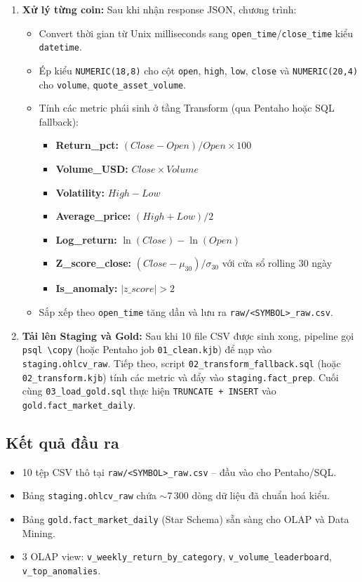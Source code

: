 \begin{enumerate}[label=\alph*)]
    \item \textbf{Xử lý từng coin:}
    Sau khi nhận response JSON, chương trình:
    \begin{itemize}
        \item Convert thời gian từ Unix milliseconds sang \texttt{open\_time}/\texttt{close\_time} kiểu \texttt{datetime}.
        \item Ép kiểu \texttt{NUMERIC(18,8)} cho cột \texttt{open}, \texttt{high}, \texttt{low}, \texttt{close} và \texttt{NUMERIC(20,4)} cho \texttt{volume}, \texttt{quote\_asset\_volume}.
        \item Tính các metric phái sinh ở tầng Transform (qua Pentaho hoặc SQL fallback):
        \begin{itemize}
            \item \textbf{Return\_pct:} $(Close - Open) / Open \times 100$
            \item \textbf{Volume\_USD:} $Close \times Volume$
            \item \textbf{Volatility:} $High - Low$
            \item \textbf{Average\_price:} $(High + Low) / 2$
            \item \textbf{Log\_return:} $\ln(Close) - \ln(Open)$
            \item \textbf{Z\_score\_close:} $(Close - \mu_{30}) / \sigma_{30}$ với cửa sổ rolling 30 ngày
            \item \textbf{Is\_anomaly:} $|z\_score| > 2$
        \end{itemize}
        \item Sắp xếp theo \texttt{open\_time} tăng dần và lưu ra \texttt{raw/<SYMBOL>\_raw.csv}.
    \end{itemize}

    \item \textbf{Tải lên Staging và Gold:}
    Sau khi 10 file CSV được sinh xong, pipeline gọi \texttt{psql \textbackslash copy} (hoặc Pentaho job \texttt{01\_clean.kjb}) để nạp vào \texttt{staging.ohlcv\_raw}. Tiếp theo, script \texttt{02\_transform\_fallback.sql} (hoặc \texttt{02\_transform.kjb}) tính các metric và đẩy vào \texttt{staging.fact\_prep}. Cuối cùng \texttt{03\_load\_gold.sql} thực hiện \texttt{TRUNCATE + INSERT} vào \texttt{gold.fact\_market\_daily}.
\end{enumerate}

\subsection{Kết quả đầu ra}
\begin{itemize}
    \item 10 tệp CSV thô tại \texttt{raw/<SYMBOL>\_raw.csv} -- đầu vào cho Pentaho/SQL.
    \item Bảng \texttt{staging.ohlcv\_raw} chứa $\sim$7\,300 dòng dữ liệu đã chuẩn hoá kiểu.
    \item Bảng \texttt{gold.fact\_market\_daily} (Star Schema) sẵn sàng cho OLAP và Data Mining.
    \item 3 OLAP view: \texttt{v\_weekly\_return\_by\_category}, \texttt{v\_volume\_leaderboard}, \texttt{v\_top\_anomalies}.
\end{itemize}

